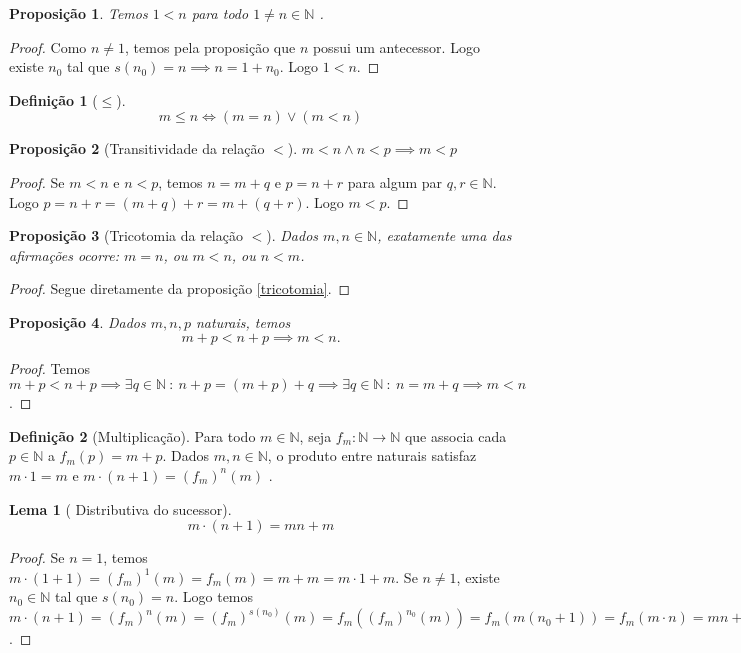 \documentclass{article}
\theoremstyle{plain}
\newtheorem{prop}{Proposição}
\newtheorem{lema}{Lema}
\theoremstyle{definition}
\newtheorem{definicao}{Definição}[section]
\theoremstyle{remark}
\begin{document}
\begin{prop}
	Temos $1 < n $ para todo $ 1 \neq n \in \mathbb{N}$ .
\end{prop}
\begin{proof}
	Como $n \neq 1$, temos pela proposição \label{propsuc} que $n$ possui um antecessor. Logo existe $n_0$ tal que $s(n_0) =n \implies n  = 1+n_0$. Logo $1<n$.
\end{proof}
\begin{definicao}[$\leq$]
	$$m \leq n \iff (m = n) \lor (m <n)$$
\end{definicao}
\begin{prop}[Transitividade da relação $<$]
	$m< n \land n< p \implies m < p$
\end{prop}
\begin{proof}
	Se $m<n$ e $n<p$, temos $n = m+q$ e $p = n+r$ para algum par $q,r\in \mathbb{N}$. Logo $p = n +r = (m +q) +r =m +(q+r)$. Logo $m<p$.
\end{proof}
\begin{prop}[Tricotomia da relação $<$]
	Dados $m,n\in \mathbb{N}$, exatamente uma das afirmações ocorre: $m=n$, ou $m<n$, ou $n<m$.
\end{prop}
\begin{proof}
	Segue diretamente da proposição \ref{tricotomia}.
\end{proof}
\begin{prop}
	Dados $m,n,p$ naturais, temos $$m +p < n+p \implies m <n.$$
\end{prop}
\begin{proof}
	Temos $m+p < n+p \implies \exists q \in \mathbb{N} \: : \: n+p = (m+p) + q \implies  \exists q \in \mathbb{N} \: : \: n = m + q \implies m<n$.
\end{proof}
\begin{definicao}[Multiplicação]
	Para todo $m\in \mathbb{N}$, seja $f_m : \mathbb{N} \to \mathbb{N}$ que associa cada $p\in \mathbb{N}$ a $f_m(p) = m+p$.
	Dados $m,n \in \mathbb{N}$, o produto entre naturais satisfaz $m\cdot 1 = m$ e  $ m\cdot (n+1) = (f_m)^n(m)$ .
\end{definicao}
\begin{lema}[ Distributiva do sucessor]
	$$m\cdot(n+1) = mn +m$$
\end{lema}
\begin{proof}
	\label{lemaDistributiva1}
	Se $n = 1$, temos  $m\cdot(1+1) = (f_m)^1(m) = f_m(m) = m+m = m\cdot 1 +m$. Se $n\neq 1$, existe $n_0\in \mathbb{N}$ tal que $s(n_0) = n$. Logo temos $m\cdot( n +1) = (f_m)^{n}(m) = (f_m)^{s(n_0)}(m) =   f_m( (f_m)^{n_0} (m)) = f_m( m(n_0+1)) = f_m(m \cdot n ) =  mn+m$.
\end{proof}
\end{document}

